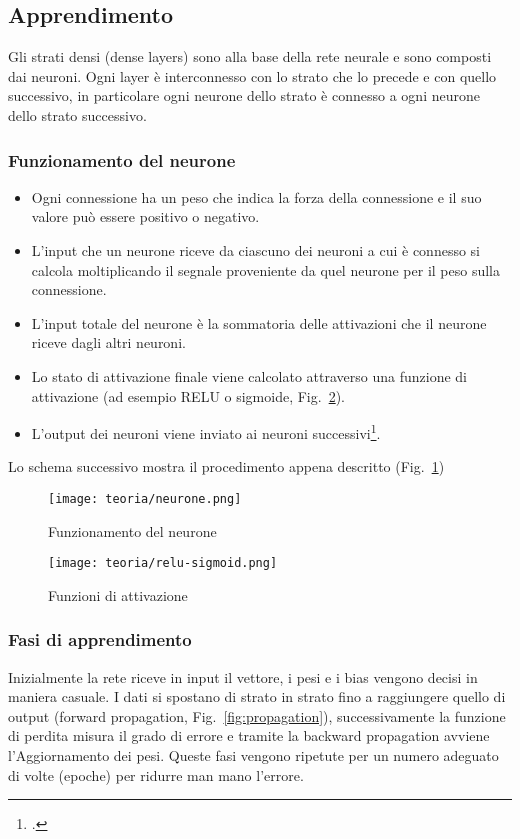 \subsection{Apprendimento}
Gli strati densi (dense layers) sono alla base della rete neurale e sono composti dai neuroni.
Ogni layer è interconnesso con lo strato che lo precede e con quello successivo, in particolare ogni neurone dello strato è connesso a ogni neurone dello strato successivo.

\subsubsection{Funzionamento del neurone}

\begin{itemize}
    \item Ogni connessione ha un peso che indica la forza della connessione e il suo valore può essere positivo o negativo.
    \item L'input che un neurone riceve da ciascuno dei neuroni a cui è connesso si calcola moltiplicando il segnale proveniente da quel neurone per il peso sulla connessione.
    \item L'input totale del neurone è la sommatoria delle attivazioni che il neurone riceve dagli altri neuroni.
    \item Lo stato di attivazione finale viene calcolato attraverso una funzione di attivazione (ad esempio RELU o sigmoide, Fig.~\ref{fig:relu-sigmoid}).
    \item L'output dei neuroni viene inviato ai neuroni successivi\footcite{LectureA}.
\end{itemize}
Lo schema successivo mostra il procedimento appena descritto (Fig.~\ref{fig:neurone})

\begin{figure}[!h] 
    \centering 
    \texttt{[image: teoria/neurone.png]} 
    \caption{Funzionamento del neurone}
    \label{fig:neurone}
  \end{figure}

  \begin{figure}[!h] 
    \centering 
    \texttt{[image: teoria/relu-sigmoid.png]} 
    \caption{Funzioni di attivazione}
    \label{fig:relu-sigmoid}
  \end{figure}

\newpage

\subsubsection{Fasi di apprendimento} 
Inizialmente la rete riceve in input il vettore, i pesi e i bias vengono decisi in maniera casuale.
I dati si spostano di strato in strato fino a raggiungere quello di output (forward propagation, Fig.~\ref{fig:propagation}), successivamente la funzione di perdita misura il grado di errore e tramite la backward propagation avviene l'Aggiornamento dei pesi.
Queste fasi vengono ripetute per un numero adeguato di volte (epoche) per ridurre man mano l'errore.


